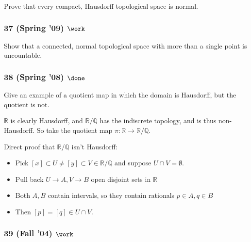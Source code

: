 Prove that every compact, Hausdorff topological space is normal.

\hypertarget{spring-09-work-1}{%
\subsubsection{\texorpdfstring{37 (Spring '09)
\(\work\)}{37 (Spring '09) \textbackslash work}}\label{spring-09-work-1}}

Show that a connected, normal topological space with more than a single
point is uncountable.

\hypertarget{spring-08-done}{%
\subsubsection{\texorpdfstring{38 (Spring '08)
\(\done\)}{38 (Spring '08) \textbackslash done}}\label{spring-08-done}}

Give an example of a quotient map in which the domain is Hausdorff, but
the quotient is not.

\begin{solution}

\hfill

\begin{concept}

\hfill

\end{concept}

\({\mathbb{R}}\) is clearly Hausdorff, and \({\mathbb{R}}/{\mathbb{Q}}\)
has the indiscrete topology, and is thus non-Hausdorff. So take the
quotient map \(\pi:{\mathbb{R}}\to {\mathbb{R}}/{\mathbb{Q}}\).

Direct proof that \({\mathbb{R}}/{\mathbb{Q}}\) isn't Hausdorff:

\begin{itemize}
\tightlist
\item
  Pick
  \([x] \subset U \neq [y] \subset V \in {\mathbb{R}}/{\mathbb{Q}}\) and
  suppose \(U\cap V = \emptyset\).
\item
  Pull back \(U\to A, V\to B\) open disjoint sets in \({\mathbb{R}}\)
\item
  Both \(A, B\) contain intervals, so they contain rationals
  \(p\in A, q\in B\)
\item
  Then \([p] = [q] \in U\cap V\).
\end{itemize}

\end{solution}

\hypertarget{fall-04-work-1}{%
\subsubsection{\texorpdfstring{39 (Fall '04)
\(\work\)}{39 (Fall '04) \textbackslash work}}\label{fall-04-work-1}}

